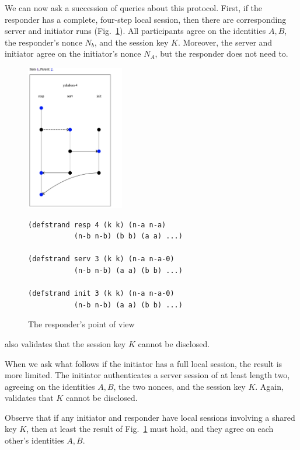 We can now ask {\cpsa} a succession of queries about this protocol.
First, if the responder has a complete, four-step local session, then
there are corresponding server and initiator runs
(Fig.~\ref{fig:yahalom:ch:resp:pov}).  All participants agree on the
identities $A,B$, the responder's nonce $N_b$, and the session key
$K$.  Moreover, the server and initiator agree on the initiator's
nonce $N_A$, but the responder does not need to.
%
\begin{figure}
  \centering
  \begin{minipage}[c][2.5in][c]{.4\linewidth}
    \includegraphics[height=2.5in]{yahalom_ch_resp_pov.png} 
  \end{minipage}
  \begin{minipage}[c][2.5in][c]{.5\linewidth}\small
\begin{verbatim}(defstrand resp 4 (k k) (n-a n-a)
           (n-b n-b) (b b) (a a) ...)

(defstrand serv 3 (k k) (n-a n-a-0)
           (n-b n-b) (a a) (b b) ...)

(defstrand init 3 (k k) (n-a n-a-0)
           (n-b n-b) (a a) (b b) ...)
\end{verbatim}
  \end{minipage}
  \caption{The responder's point of view}
  \label{fig:yahalom:ch:resp:pov}
\end{figure}
%
{\cpsa} also validates that the session key $K$ cannot be disclosed.

When we ask what follows if the initiator has a full local session,
the result is more limited.  The initiator authenticates a server
session of at least length two, agreeing on the identities $A,B$, the
two nonces, and the session key $K$.  Again, {\cpsa} validates that
$K$ cannot be disclosed.

Observe that if any initiator and responder have local sessions
involving a shared key $K$, then at least the result of
Fig.~\ref{fig:yahalom:ch:resp:pov} must hold, and they agree on each
other's identities $A,B$.


